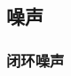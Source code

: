 \documentclass[UTF8]{ctexart}
\numberwithin{figure}{subsection}
\numberwithin{table}{subsection}
\numberwithin{equation}{subsection}
\begin{document}
\subsection{噪声}
\subsubsection{闭环噪声}
\end{document}
